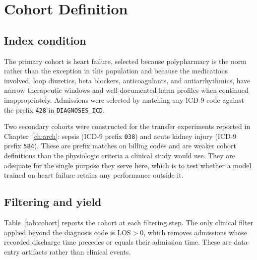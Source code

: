 \section{Cohort Definition}
\label{sec:cohort}

\subsection{Index condition}

The primary cohort is heart failure, selected because polypharmacy is the norm
rather than the exception in this population and because the medications
involved, loop diuretics, beta blockers, anticoagulants, and antiarrhythmics,
have narrow therapeutic windows and well-documented harm profiles when
continued inappropriately. Admissions were selected by matching any ICD-9 code
against the prefix \texttt{428} in \texttt{DIAGNOSES\_ICD}.

Two secondary cohorts were constructed for the transfer experiments reported in
Chapter~\ref{ch:arch}: sepsis (ICD-9 prefix \texttt{038}) and acute kidney injury
(ICD-9 prefix \texttt{584}). These are prefix matches on billing codes and are
weaker cohort definitions than the physiologic criteria a clinical study would
use. They are adequate for the single purpose they serve here, which is to test
whether a model trained on heart failure retains any performance outside it.

\subsection{Filtering and yield}

Table~\ref{tab:cohort} reports the cohort at each filtering step. The only
clinical filter applied beyond the diagnosis code is $\mathrm{LOS} > 0$, which
removes admissions whose recorded discharge time precedes or equals their
admission time. These are data-entry artifacts rather than clinical events.

